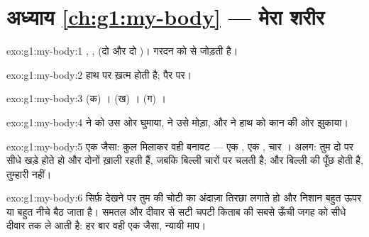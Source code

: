 \section*{अध्याय \ref{ch:g1:my-body} --- मेरा शरीर}

\begin{solution}{exo:g1:my-body:1}
, ,  (दो  और दो )। गरदन  को  से जोड़ती
है।
\end{solution}

\begin{solution}{exo:g1:my-body:2}
 हाथ पर ख़त्म होती है;  पैर पर।
\end{solution}

\begin{solution}{exo:g1:my-body:3}
(क) । (ख) । (ग) ।
\end{solution}

\begin{solution}{exo:g1:my-body:4}
 ने  को उस ओर घुमाया,  ने उसे मोड़ा, और  ने हाथ को
कान की ओर झुकाया।
\end{solution}

\begin{solution}{exo:g1:my-body:5}
एक जैसा: कुल मिलाकर वही बनावट --- एक , एक , चार । अलग: तुम
दो  पर सीधे खड़े होते हो और दोनों  ख़ाली रहती हैं, जबकि
बिल्ली चारों पर चलती है; और बिल्ली की पूँछ होती है, तुम्हारी नहीं।
\end{solution}

\begin{solution}{exo:g1:my-body:6}
सिर्फ़ देखने पर तुम  की चोटी का अंदाज़ा तिरछा लगाते हो और निशान
बहुत ऊपर या बहुत नीचे बैठ जाता है। समतल और दीवार से सटी चपटी किताब 
की सबसे ऊँची जगह को सीधे दीवार तक ले आती है: हर बार वही एक जैसा,
न्यायी माप।
\end{solution}

